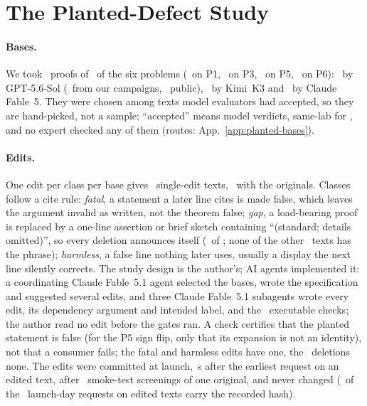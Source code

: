 \documentclass{article}
\begin{document}
\section{The Planted-Defect Study}
\label{sec:study}\label{sec:planted}

\paragraph{Bases.} We took \CRNBases\ proofs of \CRNProblemsCoveredWord\ of the six problems (\CRBasesProbOne\ on P1, \CRBasesProbThree\ on P3, \CRBasesProbFive\ on P5, \CRBasesProbSix\ on P6): \CRBasesGPT\ by GPT-5.6-Sol (\CRBasesGPTOurs\ from our campaigns, \CRBasesGPTPublic\ public), \CRBasesKimi\ by Kimi~K3 and \CRBasesClaude\ by Claude Fable~5. They were chosen among texts model evaluators had accepted, so they are hand-picked, not a sample; ``accepted'' means model verdicts, same-lab for \CRBasesSameLabWord, and no expert checked any of them (routes: App.~\ref{app:planted-bases}).

\paragraph{Edits.} One edit per class per base gives \CRNMutants\ single-edit texts, \CRNTexts\ with the originals. Classes follow a cite rule: \emph{fatal}, a statement a later line cites is made false, which leaves the argument invalid as written, not the theorem false; \emph{gap}, a load-bearing proof is replaced by a one-line assertion or brief sketch containing ``(standard; details omitted)'', so every deletion announces itself (\CRGapMarker\ of \CRNPerClass; none of the other \CRNNonGap\ texts has the phrase); \emph{harmless}, a false line nothing later uses, usually a display the next line silently corrects. The study design is the author's; AI agents implemented it: a coordinating Claude Fable~5.1 agent selected the bases, wrote the specification and suggested several edits, and three Claude Fable~5.1 subagents wrote every edit, its dependency argument and intended label, and the \CRNChecks\ executable checks; the author read no edit before the gates ran. A check certifies that the planted statement is false (for the P5 sign flip, only that its expansion is not an identity), not that a consumer fails; the fatal and harmless edits have one, the \CRNDeletions\ deletions none. The edits were committed at launch, \CRCommitLagSec\,s after the earliest request on an edited text, after \CRSmokeScreens\ smoke-test screenings of one original, and never changed (\CRHashMatch\ of the \CRMutantRequests\ launch-day requests on edited texts carry the recorded hash).
\end{document}
